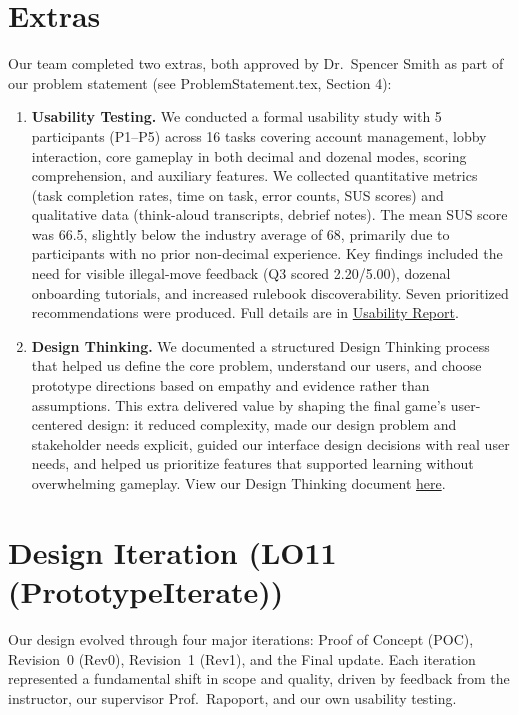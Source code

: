 \documentclass{article}
\begin{document}
\section{Extras}

Our team completed two extras, both approved by Dr.\ Spencer Smith as part of our problem statement (see ProblemStatement.tex, Section 4):

\begin{enumerate}
  \item \textbf{Usability Testing.} We conducted a formal usability study with 5 participants (P1--P5) across 16 tasks covering account management, lobby interaction, core gameplay in both decimal and dozenal modes, scoring comprehension, and auxiliary features. We collected quantitative metrics (task completion rates, time on task, error counts, SUS scores) and qualitative data (think-aloud transcripts, debrief notes). The mean SUS score was 66.5, slightly below the industry average of 68, primarily due to participants with no prior non-decimal experience. Key findings included the need for visible illegal-move feedback (Q3 scored 2.20/5.00), dozenal onboarding tutorials, and increased rulebook discoverability. Seven prioritized recommendations were produced. Full details are in \href{https://github.com/The-Crazy-Four-Games/Crazy_1-0s_Game/blob/main/docs/Extras/UsabilityTesting/UsabilityReport.pdf}{Usability Report}.
  \item \textbf{Design Thinking.} We documented a structured Design Thinking process that helped us define the core problem, understand our users, and choose prototype directions based on empathy and evidence rather than assumptions. This extra delivered value by shaping the final game’s user-centered design: it reduced complexity, made our design problem and stakeholder needs explicit, guided our interface design decisions with real user needs, and helped us prioritize features that supported learning without overwhelming gameplay. View our Design Thinking document \href{https://github.com/The-Crazy-Four-Games/Crazy_1-0s_Game/blob/136693ac684c844ff2130d5e8195fceb29dc5b93/docs/Extras/DesignThinking/DesignThinking.pdf}{here}.
\end{enumerate}


\section{Design Iteration (LO11 (PrototypeIterate))}


Our design evolved through four major iterations: Proof of Concept (POC), Revision~0 (Rev0), Revision~1 (Rev1), and the Final update. Each iteration represented a fundamental shift in scope and quality, driven by feedback from the instructor, our supervisor Prof.\ Rapoport, and our own usability testing.
\end{document}

